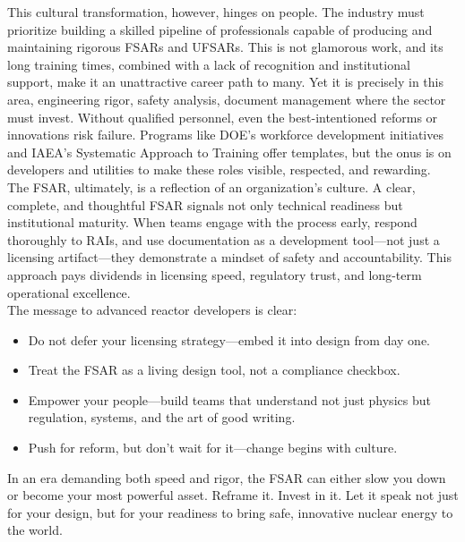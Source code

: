 \documentclass[5p,authoryear]{elsarticle}
\begin{document}
This cultural transformation, however, hinges on people. The industry must prioritize building a skilled pipeline of professionals capable of producing and maintaining rigorous FSARs and UFSARs. This is not glamorous work, and its long training times, combined with a lack of recognition and institutional support, make it an unattractive career path to many. Yet it is precisely in this area, engineering rigor, safety analysis, document management where the sector must invest. Without qualified personnel, even the best-intentioned reforms or innovations risk failure. Programs like DOE’s workforce development initiatives and IAEA’s Systematic Approach to Training offer templates, but the onus is on developers and utilities to make these roles visible, respected, and rewarding.\\

The FSAR, ultimately, is a reflection of an organization’s culture. A clear, complete, and thoughtful FSAR signals not only technical readiness but institutional maturity. When teams engage with the process early, respond thoroughly to RAIs, and use documentation as a development tool—not just a licensing artifact—they demonstrate a mindset of safety and accountability. This approach pays dividends in licensing speed, regulatory trust, and long-term operational excellence.\\

The message to advanced reactor developers is clear:

\begin{itemize}
    \item Do not defer your licensing strategy—embed it into design from day one.
    \item Treat the FSAR as a living design tool, not a compliance checkbox.
    \item Empower your people—build teams that understand not just physics but regulation, systems, and the art of good writing.
    \item Push for reform, but don’t wait for it—change begins with culture.
\end{itemize}

In an era demanding both speed and rigor, the FSAR can either slow you down or become your most powerful asset. Reframe it. Invest in it. Let it speak not just for your design, but for your readiness to bring safe, innovative nuclear energy to the world.


\end{document}
